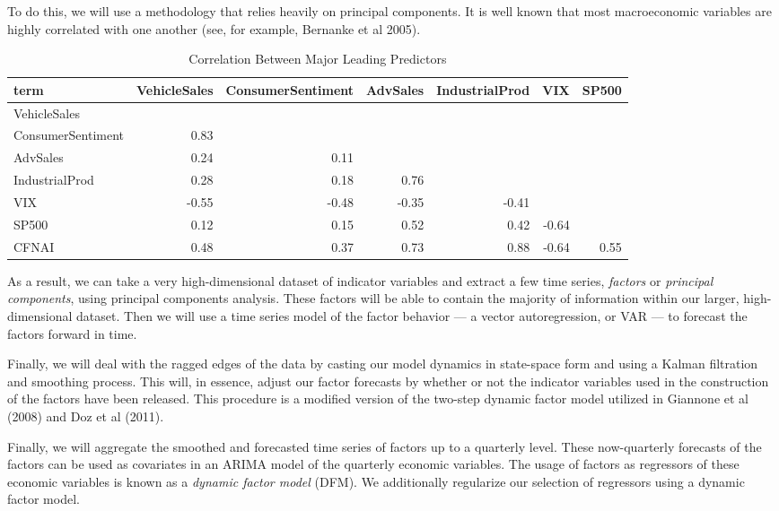 \documentclass[11pt, letterpaper]{article}\usepackage[]{graphicx}\usepackage[]{color}
\begin{document}
To do this, we will use a methodology that relies heavily on principal components. It is well known that most macroeconomic variables are highly correlated with one another (see, for example, Bernanke et al 2005).
\begin{table}[H]
\centering
\begingroup\scriptsize
\begin{tabular}{lrrrrrr}
  \hline
term & VehicleSales & ConsumerSentiment & AdvSales & IndustrialProd & VIX & SP500 \\ 
  \hline
VehicleSales &  &  &  &  &  &  \\ 
  ConsumerSentiment & 0.83 &  &  &  &  &  \\ 
  AdvSales & 0.24 & 0.11 &  &  &  &  \\ 
  IndustrialProd & 0.28 & 0.18 & 0.76 &  &  &  \\ 
  VIX & -0.55 & -0.48 & -0.35 & -0.41 &  &  \\ 
  SP500 & 0.12 & 0.15 & 0.52 & 0.42 & -0.64 &  \\ 
  CFNAI & 0.48 & 0.37 & 0.73 & 0.88 & -0.64 & 0.55 \\ 
   \hline
\end{tabular}
\endgroup
\caption{Correlation Between Major Leading Predictors} 
\end{table}

As a result, we can take a very high-dimensional dataset of indicator variables and extract a few time series, \textit{factors} or \textit{principal components}, using principal components analysis. These factors will be able to contain the majority of information within our larger, high-dimensional dataset. Then we will use a time series model of the factor behavior --- a vector autoregression, or VAR --- to forecast the factors forward in time. 

Finally, we will deal with the ragged edges of the data by casting our model dynamics in state-space form and using a Kalman filtration and smoothing process. This will, in essence, adjust our factor forecasts by whether or not the indicator variables used in the construction of the factors have been released. This procedure is a modified version of the two-step dynamic factor model utilized in Giannone et al (2008) and Doz et al (2011).

Finally, we will aggregate the smoothed and forecasted time series of factors up to a quarterly level. These now-quarterly forecasts of the factors can be used as covariates in an ARIMA model of the quarterly economic variables. The usage of factors as regressors of these economic variables is known as a \textit{dynamic factor model} (DFM). We additionally regularize our selection of regressors using a dynamic factor model.
\end{document}
